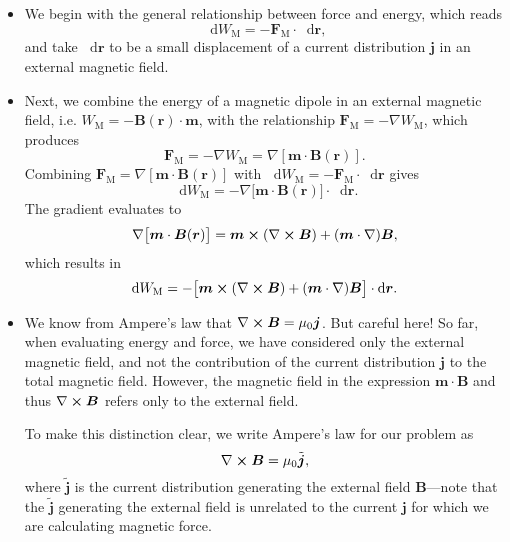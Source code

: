 \documentclass[11pt, a4paper]{article}
\newcommand{\diff}{\mathop{}\!\mathrm{d}} %
\renewcommand{\vec}[1]{\bm{#1}} %
\renewcommand{\t}[1]{\tilde{#1}} %
\renewcommand{\r}{\vec{r}}
\newcommand{\B}{\vec{B}} %
\newcommand{\mm}{\mu_{0}}  %
\newcommand{\m}{\vec{m}}  %
\renewcommand{\j}{\vec{j}}  %
\renewcommand{\curl}{\nabla \cross}
\renewcommand{\grad}{\nabla}
\begin{document}
\begin{itemize}
	\item We begin with the general relationship between force and energy, which reads
	\begin{equation*}
		\diff W_{\text{M}} = - \vec{F}_{\text{M}} \cdot \diff \r,
	\end{equation*}
	and take $ \diff \r $ to be a small displacement of a current distribution $ \j $ in an external magnetic field. 

    \item Next, we combine the energy of a magnetic dipole in an external magnetic field, i.e. 
    $ W_{\text{M}} = - \B(\r) \cdot \m $, with the relationship $ \vec{F}_{\text{M}} = - \grad W_{\text{M}}  $, which produces
    \begin{equation*}
        \vec{F}_{\text{M}} = - \grad W_{\text{M}} = \grad [ \m \cdot \B(\r) ].
    \end{equation*}
    Combining $ \vec{F}_{\text{M}} = \grad [\m \cdot \B(\r)] $ with $ \diff W_{\text{M}} = - \vec{F}_{\text{M}} \cdot \diff \r $ gives
	\begin{equation*}
		\diff W_{\text{M}} = - \grad\big[\m \cdot \B(\r)\big] \cdot \diff \r.
	\end{equation*}
	The gradient evaluates to 
	\begin{equation*}
		\grad\big[\m \cdot \B(\r)\big] = \m \cross (\curl \B) + (\m \cdot \grad)\B,
	\end{equation*}
    which results in
    \begin{equation*}
        \diff W_{\text{M}} = - \big[ \m \cross (\curl \B) + (\m \cdot \grad)\B \big] \cdot \diff \r.
    \end{equation*}
    
	\item We know from Ampere's law that $ \curl \B = \mm \j $. But careful here! So far, when evaluating energy and force, we have considered only the external magnetic field, and not the contribution of the current distribution $ \j $ to the total magnetic field. However, the magnetic field in the expression $ \m \cdot \B $ and thus $ \curl \B $ refers only to the external field.
	
	To make this distinction clear, we write Ampere's law for our problem as 
	\begin{equation*}
		\curl \B = \mm \t{\j},
	\end{equation*}
	where $ \t{\j} $ is the current distribution generating the external field $ \B $---note that the $ \t{\j} $ generating the external field is unrelated to the current $ \j $ for which we are calculating magnetic force.
	

\end{itemize}
\end{document}
